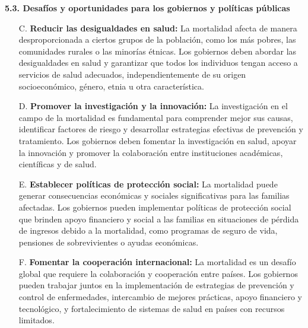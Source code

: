 \documentclass[8pt,a4paper]{beamer}
\begin{document}
{\begin{frame}{}
\begin{block}{\textbf{5.3. Desafíos y oportunidades para los gobiernos y políticas públicas}}
\begin{enumerate}
\end{enumerate}
\end{block}
\end{frame}

\begin{frame}{}
\setlength{\parskip}{3px}
\justifying
\begin{block}{}
\setlength{\parskip}{3px}
\justifying
\begin{enumerate}
\setlength{\parskip}{3px}
\justifying
\item[C.] \textbf{Reducir las desigualdades en salud:} La mortalidad afecta de manera desproporcionada a ciertos grupos de la población, como los más pobres, las comunidades rurales o las minorías étnicas. Los gobiernos deben abordar las desigualdades en salud y garantizar que todos los individuos tengan acceso a servicios de salud adecuados, independientemente de su origen socioeconómico, género, etnia u otra característica.

\item[D.] \textbf{Promover la investigación y la innovación:} La investigación en el campo de la mortalidad es fundamental para comprender mejor sus causas, identificar factores de riesgo y desarrollar estrategias efectivas de prevención y tratamiento. Los gobiernos deben fomentar la investigación en salud, apoyar la innovación y promover la colaboración entre instituciones académicas, científicas y de salud.

\item[E.] \textbf{Establecer políticas de protección social:} La mortalidad puede generar consecuencias económicas y sociales significativas para las familias afectadas. Los gobiernos pueden implementar políticas de protección social que brinden apoyo financiero y social a las familias en situaciones de pérdida de ingresos debido a la mortalidad, como programas de seguro de vida, pensiones de sobrevivientes o ayudas económicas.

\end{enumerate}
\end{block}
\end{frame}

\begin{frame}{}
\setlength{\parskip}{3px}
\justifying
\begin{block}{}
\setlength{\parskip}{3px}
\justifying
\begin{enumerate}
\setlength{\parskip}{3px}
\justifying
\item[F.] \textbf{Fomentar la cooperación internacional:} La mortalidad es un desafío global que requiere la colaboración y cooperación entre países. Los gobiernos pueden trabajar juntos en la implementación de estrategias de prevención y control de enfermedades, intercambio de mejores prácticas, apoyo financiero y tecnológico, y fortalecimiento de sistemas de salud en países con recursos limitados.


\end{enumerate}
\end{block}
\end{frame}}
\end{document}
